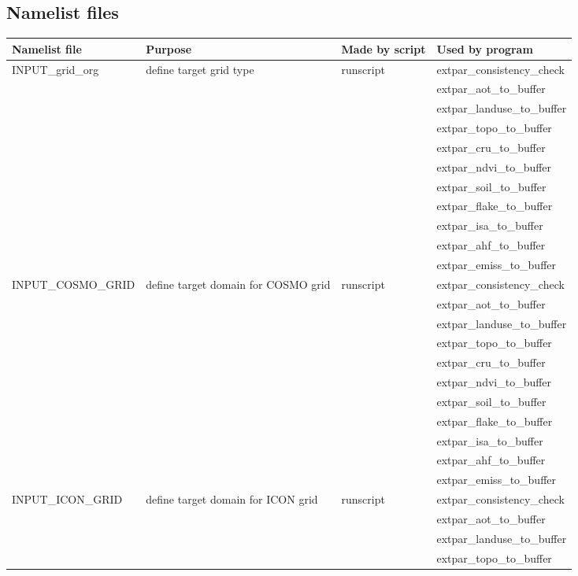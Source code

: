 \documentclass[a4paper,10pt,DIV14,BCOR1cm,titlepage,twoside]{scrartcl}
\begin{document}
\subsection{Namelist files}\label{namelist_input_for_extpar_namelist_files}
\begin{longtable}{|p{3.5cm}|p{4.8cm}|p{2.4cm}|p{3.8cm}|}
\hline 
\textbf{Namelist file} & \textbf{Purpose} & \textbf{Made by script} & \textbf{Used by program}  \\
\hline
\endhead
\hline
INPUT\_grid\_org & define target grid type    & runscript &  extpar\_consistency\_check \\
 & & & extpar\_aot\_to\_buffer \\
 & & & extpar\_landuse\_to\_buffer \\
 & & & extpar\_topo\_to\_buffer \\
 & & & extpar\_cru\_to\_buffer \\ 
 & & & extpar\_ndvi\_to\_buffer \\
 & & & extpar\_soil\_to\_buffer \\
 & & & extpar\_flake\_to\_buffer \\
 & & & extpar\_isa\_to\_buffer \\
 & & & extpar\_ahf\_to\_buffer \\
 & & & extpar\_emiss\_to\_buffer \\
\hline 
INPUT\_COSMO\_GRID   & define target domain for COSMO grid    & runscript &  extpar\_consistency\_check \\
& & & extpar\_aot\_to\_buffer \\
 & & & extpar\_landuse\_to\_buffer \\
 & & & extpar\_topo\_to\_buffer \\
 & & & extpar\_cru\_to\_buffer \\ 
 & & & extpar\_ndvi\_to\_buffer \\
 & & & extpar\_soil\_to\_buffer \\
 & & & extpar\_flake\_to\_buffer \\
 & & & extpar\_isa\_to\_buffer \\
 & & & extpar\_ahf\_to\_buffer \\
 & & & extpar\_emiss\_to\_buffer \\
\hline 
INPUT\_ICON\_GRID   & define target domain for ICON grid    & runscript &  extpar\_consistency\_check \\
& & & extpar\_aot\_to\_buffer \\
 & & & extpar\_landuse\_to\_buffer \\
 & & & extpar\_topo\_to\_buffer \\

\end{longtable}
\end{document}
